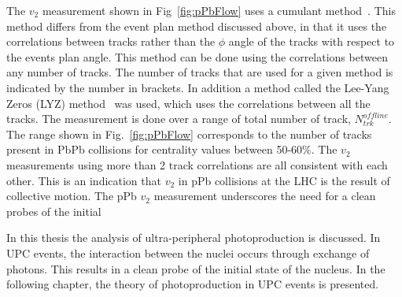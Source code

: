    The $v_{2}$ measurement shown in Fig~\ref{fig:pPbFlow} uses a cumulant 
      method~\cite{Borghini:2001zr}.
    This method differs from the event plan method discussed above, in that 
      it uses the correlations between tracks rather than the $\phi$ angle 
      of the tracks with respect to the events plan angle.
    This method can be done using the correlations between any number of 
      tracks. 
    The number of tracks that are used for a given method is 
      indicated by the number in brackets. 
    In addition a method called the Lee-Yang Zeros (LYZ) method~\cite{Borghini:2004ke,Bhalerao:2003yq} was used, 
      which uses the correlations between all the tracks. 
    The measurement is done over a range of total number of track, 
      $N^{offline}_{trk}$. 
    The range shown in Fig.~\ref{fig:pPbFlow} corresponds to the number of 
      tracks present in PbPb collisions for centrality values between 50-60\%.
    The $v_{2}$ measurements using more than 2 track correlations are all 
      consistent with each other.
    This is an indication that $v_{2}$ in pPb collisions at the LHC is the
      result of collective motion.
    The pPb $v_{2}$ measurement underscores the need for a clean probes of the initial 

    In this thesis the analysis of ultra-peripheral \JPsi{} photoproduction 
      is discussed. 
    In UPC events, the interaction between the nuclei occurs through
      exchange of photons. 
    This results in a clean probe of the initial state of the nucleus.
    In the following chapter, the theory of \JPsi{ } photoproduction in 
      UPC events is presented. 
    
